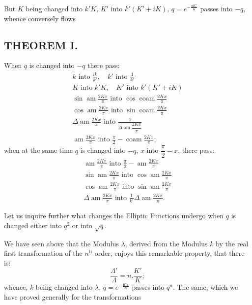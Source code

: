 \documentclass{article}
\begin{document}
But $K$ being changed into $k'K$, $K'$ into $k'(K'+iK)$, $q=e^{-\frac{\pi K'}{K}}$ passes into $-q$, whence conversely flows

\subsection*{THEOREM I.}

When $q$ is changed into $-q$ there pass:
\[
\begin{gathered}
k\text{ into }\frac{ik}{k'},\quad k'\text{ into }\frac{1}{k'}
\\[2ex]
K\text{ into }k'K,\quad K'\text{ into }k'(K'+iK)
\\[2ex]
\sin\operatorname{am}\frac{2Kx}{\pi}\text{ into }\cos\operatorname{coam}\frac{2Kx}{\pi}
\\[2ex]
\cos\operatorname{am}\frac{2Kx}{\pi}\text{ into }\sin\operatorname{coam}\frac{2Kx}{\pi}
\\[2ex]
\Delta\operatorname{am}\frac{2Kx}{\pi}\text{ into }\frac{1}{\Delta\operatorname{am}\dfrac{2Kx}{\pi}}
\\[2ex]
\operatorname{am}\frac{2Kx}{\pi}\text{ into }\frac{\pi}{2}-\operatorname{coam}\frac{2Kx}{\pi};
\end{gathered}
\]
when at the same time $q$ is changed into $-q$, $x$ into $\dfrac{\pi}{2}-x$, there pass:
\[
\begin{gathered}
\operatorname{am}\frac{2Kx}{\pi}\text{ into }\frac{\pi}{2}-\operatorname{am}\frac{2Kx}{\pi}
\\[2ex]
\sin\operatorname{am}\frac{2Kx}{\pi}\text{ into }\cos\operatorname{am}\frac{2Kx}{\pi}
\\[2ex]
\cos\operatorname{am}\frac{2Kx}{\pi}\text{ into }\sin\operatorname{am}\frac{2Kx}{\pi}
\\[2ex]
\Delta\operatorname{am}\frac{2Kx}{\pi}\text{ into }\frac{1}{k'}\Delta\operatorname{am}\frac{2Kx}{\pi}.
\end{gathered}
\]

Let us inquire further what changes the Elliptic Functions undergo when $q$ is changed either into $q^{2}$ or into $\sqrt{q}$.

We have seen above that the Modulus $\lambda$, derived from the Modulus $k$ by the real first transformation of the $n^{\mathrm{ti}}$ order, enjoys this remarkable property, that there is:
\[
\frac{\Lambda'}{\Lambda}=n.\frac{K'}{K};
\]
whence, $k$ being changed into $\lambda$, $q=e^{-\frac{K'\pi}{K}}$ passes into $q^{n}$. The same, which we have proved generally for the transformations
\end{document}

